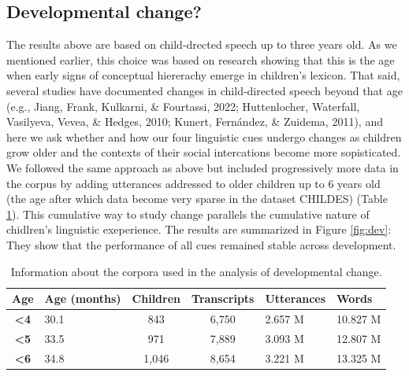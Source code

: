 \documentclass[english,,man]{apa6}
\begin{document}
\hypertarget{developmental-change}{%
\subsection{Developmental change?}\label{developmental-change}}

The results above are based on child-drected speech up to three years old. As we mentioned earlier, this choice was based on research showing that this is the age when early signs of conceptual hiererachy emerge in children's lexicon. That said, several studies have documented changes in child-directed speech beyond that age (e.g., Jiang, Frank, Kulkarni, \& Fourtassi, 2022; Huttenlocher, Waterfall, Vasilyeva, Vevea, \& Hedges, 2010; Kunert, Fernández, \& Zuidema, 2011), and here we ask whether and how our four linguistic cues undergo changes as children grow older and the contexts of their social intercations become more sopisticated. We followed the same approach as above but included progressively more data in the corpus by adding utterances addressed to older children up to 6 years old (the age after which data become very sparse in the dataset CHILDES) (Table \ref{tab:development}). This cumulative way to study change parallels the cumulative nature of chidlren's linguistic exeperience. The results are summarized in Figure \ref{fig:dev}: They show that the performance of all cues remained stable across development.

\begin{table}[!htbp] \centering 
\caption{\label{tab:development} Information about the corpora used in the analysis of developmental change.}
\begin{tabularx}{\linewidth}{cXccXX}

\textbf{Age} & Age (months) & Children & Transcripts & Utterances & Words \\
\hline

\textbf{\textless4} & 30.1 & 843 & 6,750 & 2.657 M & 10.827 M\\

\textbf{\textless5} & 33.5 & 971 & 7,889 & 3.093 M & 12.807 M\\

\textbf{\textless6} & 34.8 & 1,046 & 8,654 & 3.221 M & 13.325 M\\

\hline
\end{tabularx}

\end{table}
\end{document}
